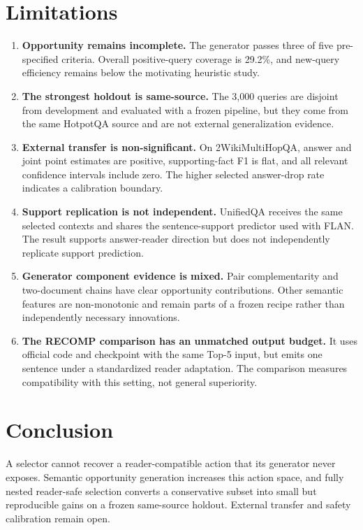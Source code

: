 \section{Limitations}

\begin{enumerate}
\item \textbf{Opportunity remains incomplete.} The generator passes three of five pre-specified criteria. Overall positive-query coverage is 29.2\%, and new-query efficiency remains below the motivating heuristic study.
\item \textbf{The strongest holdout is same-source.} The 3,000 queries are disjoint from development and evaluated with a frozen pipeline, but they come from the same HotpotQA source and are not external generalization evidence.
\item \textbf{External transfer is non-significant.} On 2WikiMultiHopQA, answer and joint point estimates are positive, supporting-fact F1 is flat, and all relevant confidence intervals include zero. The higher selected answer-drop rate indicates a calibration boundary.
\item \textbf{Support replication is not independent.} UnifiedQA receives the same selected contexts and shares the sentence-support predictor used with FLAN. The result supports answer-reader direction but does not independently replicate support prediction.
\item \textbf{Generator component evidence is mixed.} Pair complementarity and two-document chains have clear opportunity contributions. Other semantic features are non-monotonic and remain parts of a frozen recipe rather than independently necessary innovations.
\item \textbf{The RECOMP comparison has an unmatched output budget.} It uses official code and checkpoint with the same Top-5 input, but emits one sentence under a standardized reader adaptation. The comparison measures compatibility with this setting, not general superiority.
\end{enumerate}

\section{Conclusion}

A selector cannot recover a reader-compatible action that its generator never exposes. Semantic opportunity generation increases this action space, and fully nested reader-safe selection converts a conservative subset into small but reproducible gains on a frozen same-source holdout. External transfer and safety calibration remain open.
